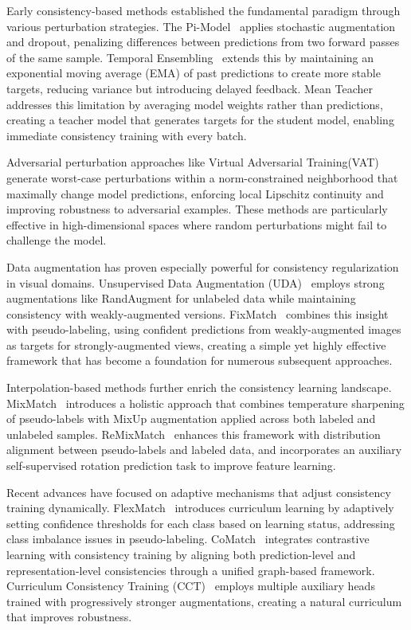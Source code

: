 Early consistency-based methods established the fundamental paradigm through various perturbation strategies. The Pi-Model~\cite{sajjadi2016regularization} applies stochastic augmentation and dropout, penalizing differences between predictions from two forward passes of the same sample. Temporal Ensembling~\cite{laine2016temporal} extends this by maintaining an exponential moving average (EMA) of past predictions to create more stable targets, reducing variance but introducing delayed feedback. Mean Teacher~\cite{tarvainen2017mean} addresses this limitation by averaging model weights rather than predictions, creating a teacher model that generates targets for the student model, enabling immediate consistency training with every batch.

Adversarial perturbation approaches like Virtual Adversarial Training(VAT)~\cite{miyato2017virtual} generate worst-case perturbations within a norm-constrained neighborhood that maximally change model predictions, enforcing local Lipschitz continuity and improving robustness to adversarial examples. These methods are particularly effective in high-dimensional spaces where random perturbations might fail to challenge the model.

Data augmentation has proven especially powerful for consistency regularization in visual domains. Unsupervised Data Augmentation (UDA)~\cite{xie2019unsupervised} employs strong augmentations like RandAugment for unlabeled data while maintaining consistency with weakly-augmented versions. FixMatch~\cite{sohn2020fixmatch} combines this insight with pseudo-labeling, using confident predictions from weakly-augmented images as targets for strongly-augmented views, creating a simple yet highly effective framework that has become a foundation for numerous subsequent approaches.

Interpolation-based methods further enrich the consistency learning landscape. MixMatch~\cite{berthelot2019mixmatch} introduces a holistic approach that combines temperature sharpening of pseudo-labels with MixUp augmentation applied across both labeled and unlabeled samples. ReMixMatch~\cite{berthelot2019remixmatch} enhances this framework with distribution alignment between pseudo-labels and labeled data, and incorporates an auxiliary self-supervised rotation prediction task to improve feature learning.

Recent advances have focused on adaptive mechanisms that adjust consistency training dynamically. FlexMatch~\cite{zhang2021flexmatch} introduces curriculum learning by adaptively setting confidence thresholds for each class based on learning status, addressing class imbalance issues in pseudo-labeling. CoMatch~\cite{li2021comatch} integrates contrastive learning with consistency training by aligning both prediction-level and representation-level consistencies through a unified graph-based framework. Curriculum Consistency Training (CCT)~\cite{liu2024curriculum} employs multiple auxiliary heads trained with progressively stronger augmentations, creating a natural curriculum that improves robustness.

